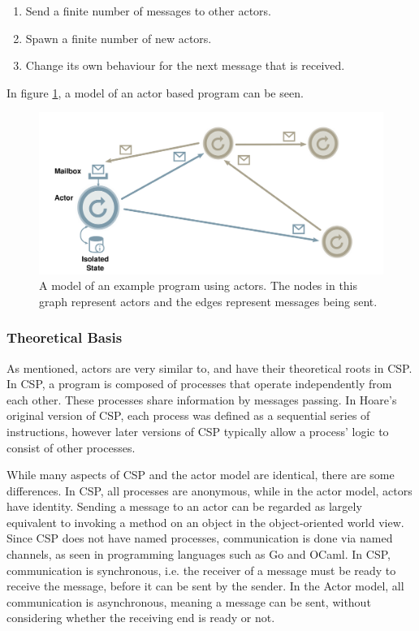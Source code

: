\begin{enumerate}
  \item Send a finite number of messages to other actors.
  \item Spawn a finite number of new actors.
  \item Change its own behaviour for the next message that is received.
\end{enumerate}

In figure \ref{fig:actor}, a model of an actor based program can be seen.

\begin{figure}
  \includegraphics[width=\textwidth]{Images/actors.pdf}
  \caption{A model of an example program using actors. The nodes in this graph represent actors and the edges represent messages being sent.}
  \label{fig:actor}
\end{figure}

\subsubsection{Theoretical Basis} 
As mentioned, actors are very similar to, and have their theoretical roots in CSP.
In CSP, a program is composed of processes that operate independently from each other. These processes share information by messages passing. In Hoare's original version of CSP, each process was defined as a sequential series of instructions, however later versions of CSP typically allow a process' logic to consist of other processes.

While many aspects of CSP and the actor model are identical, there are some differences. In CSP, all processes are anonymous, while in the actor model, actors have identity. Sending a message to an actor can be regarded as largely equivalent to invoking a method on an object in the object-oriented world view. Since CSP does not have named processes, communication is done via named channels, as seen in programming languages such as Go and OCaml. 
In CSP, communication is synchronous, i.e. the receiver of a message must be ready to receive the message, before it can be sent by the sender. In the Actor model, all communication is asynchronous, meaning a message can be sent, without considering whether the receiving end is ready or not.

